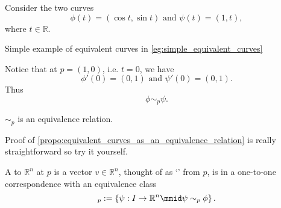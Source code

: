 \documentclass[notoc,notitlepage]{tufte-book}
\begin{document}
\begin{eg}\label{eg:simple_equivalent_curves}
  Consider the two curves
  \begin{equation*}
    \phi(t) = (\cos t, \sin t) \text{ and } \psi(t) = (1, t),
  \end{equation*}
  where $t \in \mathbb{R}$.
  \begin{marginfigure}
    \centering
    \caption{Simple example of equivalent curves in \cref{eg:simple_equivalent_curves}}\label{fig:simple_example_of_equivalent_curves}
  \end{marginfigure}
  Notice that at $p = (1, 0)$, i.e. $t = 0$, we have
  \begin{equation*}
    \phi'(0) = (0, 1) \text{ and } \psi'(0) = (0, 1).
  \end{equation*}
  Thus
  \begin{equation*}
    \phi \sim_p \psi.
  \end{equation*}
\end{eg}

\begin{propo}\label{propo:equivalent_curves_as_an_equivalence_relation}
  $\sim_p$ is an equivalence relation.
\end{propo}

\begin{ex}
  Proof of \cref{propo:equivalent_curves_as_an_equivalence_relation} is really
  straightforward so try it yourself.
\end{ex}

\begin{defn}\label{defn:tangent_vector}
  A  to $\mathbb{R}^n$ at $p$ is a vector $v \in \mathbb{R}^n$,
  thought of as `' from $p$, is in a one-to-one correspondence
  with an equivalence class
  \begin{equation*}
    [\phi]_p := \left\{ \psi : I \to \mathbb{R}^n \mmid \psi \sim_p \phi \right\}.
  \end{equation*}
\end{defn}
\end{document}
